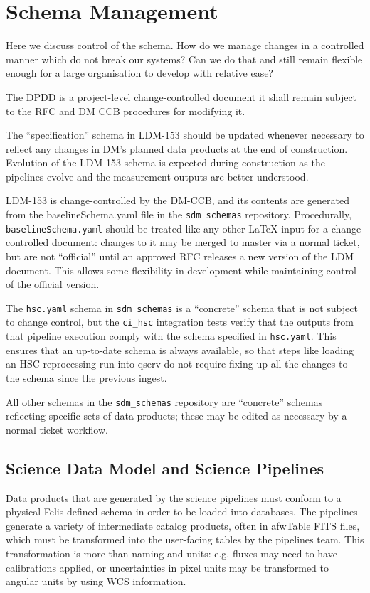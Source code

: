 \section{Schema Management}

Here we discuss control of the schema.
How do we manage changes in a controlled manner which do not break our systems?
Can we do that and still remain flexible enough for a large organisation to develop with relative ease?

The DPDD is a project-level change-controlled document it shall remain subject to the RFC and DM CCB  procedures for modifying it.

The ``specification'' schema in LDM-153 should be updated whenever necessary to reflect any changes
in DM's planned data products at the end of construction. Evolution of the LDM-153 schema is
expected during construction as the pipelines evolve and the measurement outputs are better
understood.

LDM-153 is change-controlled by the DM-CCB, and its contents are generated from the baselineSchema.yaml file
in the \texttt{sdm\_schemas} repository. Procedurally, \texttt{baselineSchema.yaml} should be
treated like any other LaTeX input for a change controlled document: changes to it may be merged to
master via a normal ticket, but are not ``official'' until an approved RFC releases a new version of
the LDM document.  This allows some flexibility in development while maintaining control of the official version.

The \texttt{hsc.yaml} schema in \texttt{sdm\_schemas} is a ``concrete'' schema that is not subject
to change control, but the \texttt{ci\_hsc} integration tests verify that the outputs from that
pipeline execution comply with the schema specified in \texttt{hsc.yaml}. This ensures that an
up-to-date schema is always available, so that steps like loading an HSC reprocessing run into qserv
do not require fixing up all the changes to the schema since the previous ingest.

All other schemas in the \texttt{sdm\_schemas} repository are ``concrete'' schemas reflecting
specific sets of data products; these may be edited as necessary by a normal ticket workflow.


\subsection{Science Data Model and Science Pipelines}
Data products that are generated by the science pipelines must conform to a physical Felis-defined
schema in order to be loaded into databases. The pipelines generate a variety of intermediate
catalog products, often in afwTable FITS files, which must be transformed into the user-facing
tables by the pipelines team. This transformation is more than naming and units: e.g. fluxes may
need to have calibrations applied, or uncertainties in pixel units may be transformed to angular
units by using WCS information.

